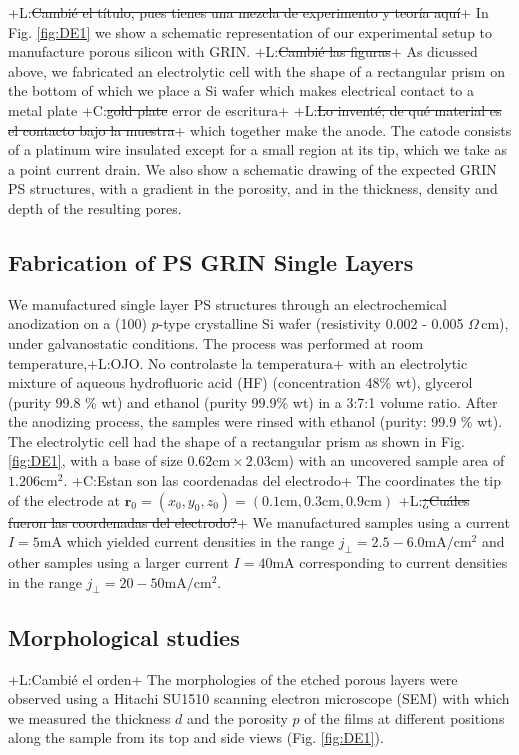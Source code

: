 \documentclass{article}
\newcommand{\notaL}[1]{{\color{blue}+L:#1+}}
\newcommand{\notaC}[1]{{\color{green}+C:#1+}}
\begin{document}
\notaL{\sout{Cambié el título, pues tienes una mezcla de experimento y
  teoría aquí}}
In Fig. \ref{fig:DE1} we show a schematic representation of our
experimental setup to manufacture porous silicon with GRIN.
\notaL{\sout{Cambié las figuras}}
As dicussed above, we fabricated an electrolytic cell with the shape of a
rectangular prism on the bottom of which we place a Si wafer which makes
electrical contact to a metal plate \notaC{\sout{gold plate} error de escritura} 
\notaL{\sout{Lo inventé; de qué material es el contacto bajo la muestra}}
 which together make the anode. The catode consists of a platinum wire 
 insulated except for a small region at its tip, which we take as a 
 point current drain.
We also show a schematic drawing of the expected GRIN PS structures,
with a gradient in the porosity, and in the thickness, density and depth
of the resulting pores.

\subsection{Fabrication of PS  GRIN Single Layers}
\label{sec:fabrication-ps-grin}
We manufactured single layer PS structures through an electrochemical
anodization on a (100) $p$-type crystalline Si wafer
(resistivity 0.002 - 0.005 $ \Omega\,\text{cm}$), under galvanostatic
conditions. The process was performed at
room temperature,\notaL{OJO. No controlaste la temperatura} with an
electrolytic mixture of aqueous hydrofluoric
acid (HF) (concentration 48\% wt), glycerol (purity 99.8 \% wt) and
ethanol (purity 99.9\% wt) in a 3:7:1 volume ratio. After the
anodizing process, the samples were rinsed with
ethanol (purity: 99.9 $ \% $  wt). The electrolytic cell had the shape
of a rectangular prism as shown in Fig. \ref{fig:DE1}, with a base of
size $0.62\text{cm}\times2.03\text{cm}$) with an uncovered sample area
of $1.206\text{cm}^2$. \notaC{Estan son las coordenadas del electrodo} The coordinates the tip of the
electrode at $\bm
r_0=(x_0,y_0,z_0)=(0.1\text{cm},0.3\text{cm},0.9\text{cm})$
\notaL{\sout{¿Cuáles fueron las coordenadas del
  electrodo?}} We manufactured samples using a current $I=5\text{mA}$
which yielded current densities in the range
$j_\perp=2.5-6.0\text{mA}/\text{cm}^2$ and other samples using a larger
current $I=40\text{mA}$ corresponding to current densities in the
range $j_\perp=20-50\text{mA}/\text{cm}^2$.
\subsection{Morphological studies}
\label{sec:morph-stud}
\notaL{Cambié el orden}
The morphologies of the etched porous layers were
observed using a Hitachi SU1510 scanning electron microscope (SEM)
with which we measured the thickness $d$ and the porosity $p$ of the
films at different positions along the sample from its top and side
views (Fig. \ref{fig:DE1}).
\end{document}
